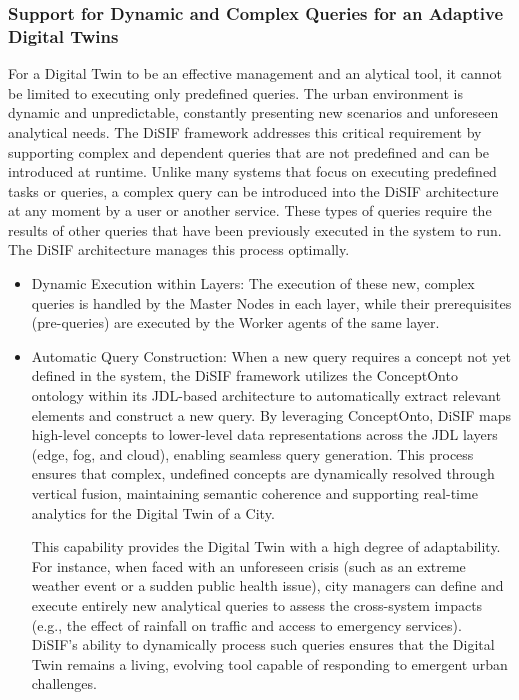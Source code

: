\documentclass[5p,times]{elsarticle}
\begin{document}
\subsubsection{ Support for Dynamic and Complex Queries for an Adaptive Digital Twins}

For a Digital Twin to be an effective management and an
alytical tool, it cannot be limited to executing only predefined
queries. The urban environment is dynamic and unpredictable,
 constantly presenting new scenarios and unforeseen analytical
 needs. The DiSIF framework addresses this critical requirement
 by supporting
 complex and dependent queries that are not predefined and
 can be introduced at runtime.
 Unlike many systems that focus on executing predefined
 tasks or queries, a complex query can be introduced into the
 DiSIF architecture at any moment by a user or another service.
 These types of queries require the results of other queries that
 have been previously executed in the system to run. The DiSIF
 architecture manages this process optimally.

 \begin{itemize}
  \item  Dynamic Execution within Layers: The execution of these
  new, complex queries is handled by the Master Nodes in each
  layer, while their prerequisites (pre-queries) are executed by the
  Worker agents of the same layer.

  \item Automatic Query Construction: 
  When a new query requires a concept not yet defined in the system,
   the DiSIF framework utilizes the ConceptOnto ontology within its JDL-based architecture
    to automatically extract relevant elements and construct a new query.
     By leveraging ConceptOnto, DiSIF maps high-level concepts to lower-level
      data representations across the JDL layers (edge, fog, and cloud),
       enabling seamless query generation. This process ensures that complex,
        undefined concepts are dynamically resolved through vertical fusion,
         maintaining semantic coherence and supporting real-time analytics for the 
         Digital Twin of a City.


  This capability provides the Digital Twin with a high degree
  of adaptability. For instance, when faced with an unforeseen
  crisis (such as an extreme weather event or a sudden public
  health issue), city managers can define and execute entirely new
  analytical queries to assess the cross-system impacts (e.g., the
  effect of rainfall on traffic and access to emergency services).
  DiSIF’s ability to dynamically process such queries ensures
  that the Digital Twin remains a living, evolving tool capable of
  responding to emergent urban challenges.

 \end{itemize}
\end{document}
